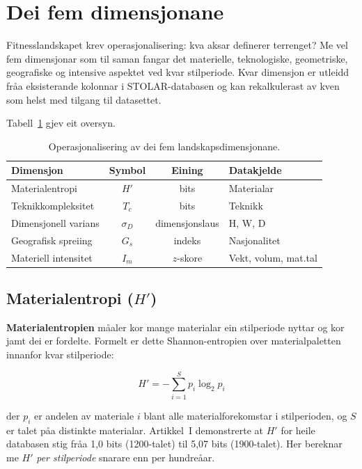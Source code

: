 \documentclass[10pt, a4paper, twocolumn]{article}
\begin{document}
\section{Dei fem dimensjonane}

Fitnesslandskapet krev operasjonalisering: kva aksar definerer terrenget? Me vel fem dimensjonar som til saman fangar det materielle, teknologiske, geometriske, geografiske og intensive aspektet ved kvar stilperiode. Kvar dimensjon er utleidd fr\r{a}a eksisterande kolonnar i STOLAR-databasen og kan rekalkulerast av kven som helst med tilgang til datasettet.

Tabell~\ref{tab:operasjonalisering} gjev eit oversyn.

\begin{table}[H]
\centering
\caption{Operasjonalisering av dei fem landskapsdimensjonane.}
\label{tab:operasjonalisering}
\begin{tabular}{lccl}
\toprule
\textbf{Dimensjon} & \textbf{Symbol} & \textbf{Eining} & \textbf{Datakjelde} \\
\midrule
Materialentropi       & $H'$       & bits           & Materialar \\
Teknikkompleksitet   & $T_c$      & bits           & Teknikk \\
Dimensjonell varians & $\sigma_D$ & dimensjonslaus & H, W, D \\
Geografisk spreiing  & $G_s$      & indeks         & Nasjonalitet \\
Materiell intensitet & $I_m$      & $z$-skore      & Vekt, volum, mat.tal \\
\bottomrule
\end{tabular}
\end{table}


\subsection{Materialentropi ($H'$)}

\textbf{Materialentropien} m\r{a}aler kor mange materialar ein stilperiode nyttar og kor jamt dei er fordelte. Formelt er dette Shannon-entropien \citep{shannon1948} over materialpaletten innanfor kvar stilperiode:

\begin{equation}
  H' = -\sum_{i=1}^{S} p_i \log_2 p_i
\end{equation}

\noindent der $p_i$ er andelen av materiale $i$ blant alle materialforekomstar i stilperioden, og $S$ er talet p\r{a}a distinkte materialar. Artikkel~I demonstrerte at $H'$ for heile databasen stig fr\r{a}a 1{,}0 bits (1200-talet) til 5{,}07 bits (1900-talet). Her bereknar me $H'$ \emph{per stilperiode} snarare enn per hundre\r{a}ar.
\end{document}
